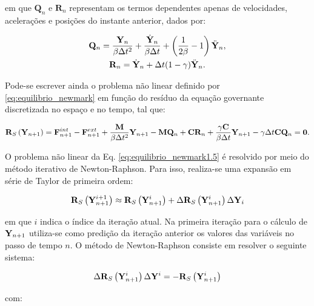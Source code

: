 \documentclass[tese_patricia]{subfiles}
\begin{document}
\noindent em que $\mathbf{Q}_n$ e $\mathbf{R}_n$ representam os termos dependentes apenas de velocidades, acelerações e posições do instante anterior, dados por:

\begin{gather}
\mathbf{Q}_n = \frac{\mathbf{Y}_n}{\beta \Delta t^2} + \frac{\dot{\mathbf{Y}}_n}{\beta \Delta t} + \left(\frac{1}{2\beta} -1 \right)\ddot{\mathbf{Y}}_n,\label{eq:Qn}\\
\mathbf{R}_n = \dot{\mathbf{Y}}_n+\Delta t(1-\gamma)\ddot{\mathbf{Y}}_n.\label{eq:Rn}
\end{gather}


Pode-se escrever ainda o problema não linear definido por
\eqref{eq:equilibrio_newmark} em função do resíduo da equação governante
discretizada no espaço e no tempo, tal que:

\begin{gather}
\mathbf{R}_S\left(\mathbf{Y}_{n+1}\right) = \mathbf{F}^{int}_{n+1}- \mathbf{F}^{ext}_{n+1} + \frac{\mathbf{M}}{\beta \Delta t^2} \mathbf{Y}_{n+1}-\mathbf{M} \mathbf{Q}_n+ \mathbf{C}\mathbf{R}_n + \frac{\gamma \mathbf{C}}{\beta \Delta t}\mathbf{Y}_{n+1} - \gamma\Delta t \mathbf{C}\mathbf{Q}_n= \mathbf{0}.
\label{eq:equilibrio_newmark1.5}
\end{gather}

O problema não linear da Eq. \eqref{eq:equilibrio_newmark1.5} é resolvido por meio do método iterativo de Newton-Raphson. Para isso, realiza-se uma expansão em série de Taylor de primeira ordem:

\begin{gather}
\mathbf{R}_S\left(\mathbf{Y}_{n+1}^{i+1}\right) \approx \mathbf{R}_S\left(\mathbf{Y}_{n+1}^{i}\right) + \Delta\mathbf{R}_S\left(\mathbf{Y}_{n+1}^{i}\right)\Delta\mathbf{Y}_{i} 
\end{gather}

\noindent em que $i$ indica o índice da iteração atual. Na primeira iteração para o cálculo de $\mathbf{Y}_{n+1}$ utiliza-se como predição da iteração anterior os valores das variáveis no passo de tempo $n$. O método de Newton-Raphson consiste em resolver o seguinte sistema:

\begin{gather}
\Delta\mathbf{R}_S\left(\mathbf{Y}_{n+1}^{i}\right)\Delta\mathbf{Y}^{i} = -\mathbf{R}_S\left(\mathbf{Y}_{n+1}^{i}\right) \label{eq:NR}
\end{gather}

\noindent com:
\end{document}
